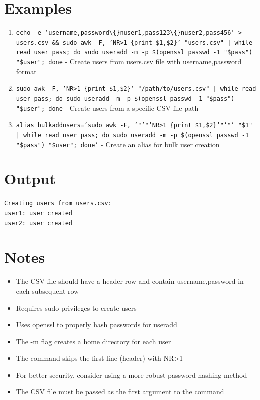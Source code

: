 \documentclass[openany]{book}
\begin{document}
\section*{Examples}
\begin{enumerate}
  \item \texttt{echo -e 'username,password\textbackslash\{\}nuser1,pass123\textbackslash\{\}nuser2,pass456' > users.csv \&\& sudo awk -F, 'NR>1 \{print \$1,\$2\}' "users.csv" | while read user pass; do sudo useradd -m -p \$(openssl passwd -1 "\$pass") "\$user"; done} - Create users from users.csv file with username,password format
  \item \texttt{sudo awk -F, 'NR>1 \{print \$1,\$2\}' "/path/to/users.csv" | while read user pass; do sudo useradd -m -p \$(openssl passwd -1 "\$pass") "\$user"; done} - Create users from a specific CSV file path
  \item \texttt{alias bulkaddusers='sudo awk -F, '"'"'NR>1 \{print \$1,\$2\}'"'"' "\$1" | while read user pass; do sudo useradd -m -p \$(openssl passwd -1 "\$pass") "\$user"; done'} - Create an alias for bulk user creation
\end{enumerate}

\section*{Output}
\begin{lstlisting}
Creating users from users.csv:
user1: user created
user2: user created
\end{lstlisting}

\section*{Notes}
\begin{itemize}
  \item The CSV file should have a header row and contain username,password in each subsequent row
  \item Requires sudo privileges to create users
  \item Uses openssl to properly hash passwords for useradd
  \item The -m flag creates a home directory for each user
  \item The command skips the first line (header) with NR>1
  \item For better security, consider using a more robust password hashing method
  \item The CSV file must be passed as the first argument to the command
\end{itemize}
\end{document}
